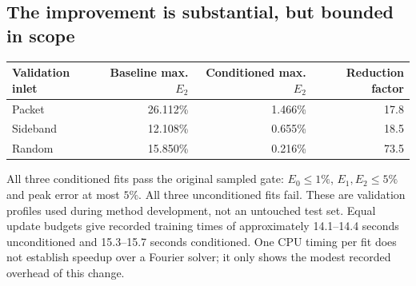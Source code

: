 \subsection{The improvement is substantial, but bounded in scope}
\begin{center}\small
\begin{tabular}{lrrr}\toprule
Validation inlet & Baseline max. $E_2$ & Conditioned max. $E_2$ & Reduction factor \\\midrule
Packet & 26.112\% & 1.466\% & 17.8 \\
Sideband & 12.108\% & 0.655\% & 18.5 \\
Random & 15.850\% & 0.216\% & 73.5 \\\bottomrule
\end{tabular}
\end{center}
All three conditioned fits pass the original sampled gate: $E_0\le1\%$, $E_1,E_2\le5\%$ and peak error at most $5\%$. All three unconditioned fits fail. These are validation profiles used during method development, not an untouched test set. Equal update budgets give recorded training times of approximately 14.1--14.4 seconds unconditioned and 15.3--15.7 seconds conditioned. One CPU timing per fit does not establish speedup over a Fourier solver; it only shows the modest recorded overhead of this change.
\clearpage
